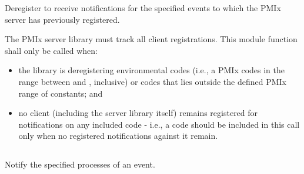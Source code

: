 \descr

Deregister to receive notifications for the specified events to which the \ac{PMIx} server has previously registered.

\adviceimplstart
The \ac{PMIx} server library must track all client registrations. This module function shall only be called when:

\begin{itemize}
    \item the library is deregistering environmental codes (i.e., a \ac{PMIx} codes in the range between  and , inclusive) or codes that lies outside the defined \ac{PMIx} range of constants; and
    \item no client (including the server library itself) remains registered for notifications on any included code - i.e., a code should be included in this call only when no registered notifications against it remain.
\end{itemize}

\adviceimplend


\subsection{}

\summary

Notify the specified processes of an event.

\format


